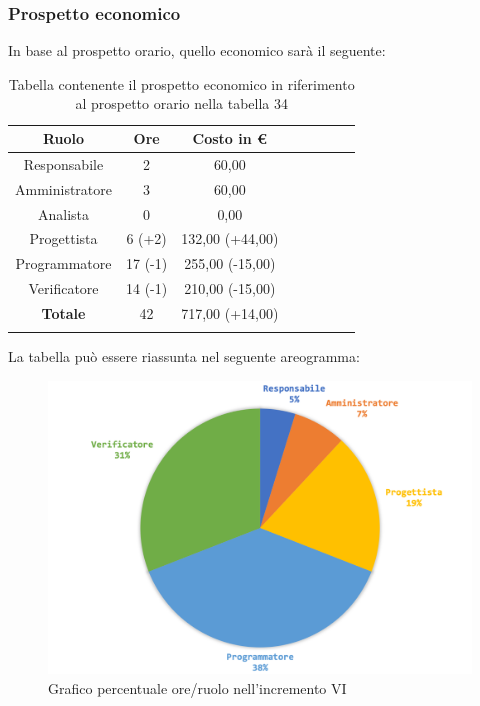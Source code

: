 		\subsubsection{Prospetto economico}
			In base al prospetto orario, quello economico sarà il seguente: 
			
			\begin{longtable}{|c|c|c|c|c|c|c|c}
				\hline
				\rowcolor{lighter-grayer}
				\textbf{Ruolo} & \textbf{Ore} & \textbf{Costo in €} \\
				\hline
				\endfirsthead
				\hline
			Responsabile 	    & 2 & 60,00\\
			\hline 
			\hline
			Amministratore	  & 3 & 60,00\\
			\hline
			\hline
			Analista 				& 0 & 0,00\\
			\hline
			\hline
			Progettista 		  & 6 (+2) & 132,00 (+44,00)\\
			\hline
			\hline
			Programmatore 	 & 17 (-1) & 255,00 (-15,00)\\
			\hline
			\hline
			Verificatore 		  & 14 (-1)  & 210,00 (-15,00)\\
			\hline
			\textbf{Totale} 	& 42 & 717,00 (+14,00) \\
			\hline
				
				\caption{Tabella contenente il prospetto economico in riferimento al prospetto orario nella tabella 34}
			\end{longtable}
			\pagebreak
			
			La tabella può essere riassunta nel seguente areogramma:
			\begin{figure}[H]
				\centering
				\includegraphics[width=0.8\linewidth]{images/consuntivo/ConsIncr6-2.png}
				\caption{Grafico percentuale ore/ruolo nell'incremento VI}
				\label{fig:grafico costi ruolo incremento VI}
			\end{figure}			


